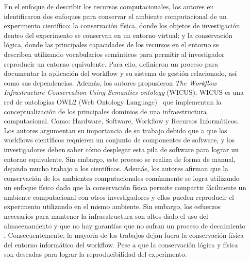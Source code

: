 En el enfoque de describir los recursos computacionales, los autores en \cite{santana2017reproducibility} identificaron dos enfoques para conservar el  ambiente computacional de un experimento científico: la conservación física, donde los objetos de investigación dentro del experimento se conservan en un entorno virtual; y la conservación lógica, donde las principales capacidades de los recursos en el entorno se describen utilizando vocabularios semánticos para permitir al investigador reproducir un entorno equivalente.
Para ello, definieron un proceso para documentar la aplicación del workflow y su sistema de gestión relacionado, así como sus dependencias.
Además, los autores propusieron \textit{The Workflow Infrastructure Conservation Using Semantics ontology} (WICUS). WICUS es una red de ontologías OWL2 (Web Ontology Language)~\cite{motik2009owl} que implementan la conceptualización de los principales dominios de una infraestructura computacional. Como: Hardware, Software, Workflow y Recursos Informáticos. 
Los autores argumentan su importancia de su trabajo debido que a que los workflows científicos requieren un conjunto de componentes de software, y los investigadores deben saber cómo desplegar esta pila de software para lograr un entorno equivalente.
Sin embargo, este proceso se realiza de forma de manual, dejando mucho trabajo a los científicos.
Además, los autores afirman que la conservación de los ambientes computacionales comúnmente se logra utilizando un enfoque físico dado que la conservación física permite compartir fácilmente un ambiente computacional con otros investigadores y ellos pueden reproducir el experimento utilizando en el mismo ambiente. 
Sin embargo, los esfuerzos necesarios para mantener la infraestructura son altos dado el uso del almacenamiento y que no hay garantías que no sufran un proceso de decaimiento \cite{DBLP:journals/fgcs/DeelmanVJRCMMCS15}.  
Consecuentemente, la mayoría de los trabajos dejan fuera la conservación física del entorno informático del workflow. Pese a que la conservación lógica y física son deseadas para lograr la reproducibilidad del experimento.

